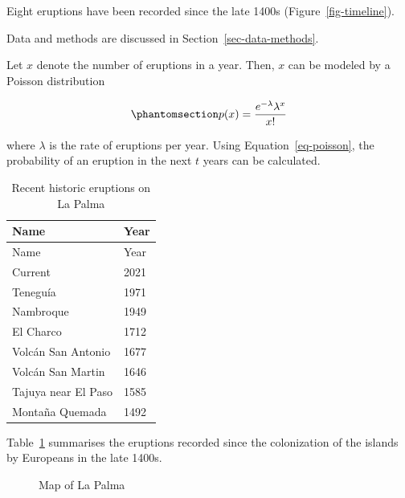 \documentclass[
]{agujournal2019}
\begin{document}
Eight eruptions have been recorded since the late 1400s
(Figure~\ref{fig-timeline}).

Data and methods are discussed in Section~\ref{sec-data-methods}.

Let \(x\) denote the number of eruptions in a year. Then, \(x\) can be
modeled by a Poisson distribution

\begin{equation}\phantomsection\label{eq-poisson}{
p(x) = \frac{e^{-\lambda} \lambda^{x}}{x !}
}\end{equation}

where \(\lambda\) is the rate of eruptions per year. Using
Equation~\ref{eq-poisson}, the probability of an eruption in the next
\(t\) years can be calculated.

\begin{longtable}[]{@{}ll@{}}
\caption{Recent historic eruptions on La
Palma}\label{tbl-history}\tabularnewline
\toprule\noalign{}
Name & Year \\
\midrule\noalign{}
\endfirsthead
\toprule\noalign{}
Name & Year \\
\midrule\noalign{}
\endhead
\bottomrule\noalign{}
\endlastfoot
Current & 2021 \\
Teneguía & 1971 \\
Nambroque & 1949 \\
El Charco & 1712 \\
Volcán San Antonio & 1677 \\
Volcán San Martin & 1646 \\
Tajuya near El Paso & 1585 \\
Montaña Quemada & 1492 \\
\end{longtable}

Table~\ref{tbl-history} summarises the eruptions recorded since the
colonization of the islands by Europeans in the late 1400s.

\begin{figure}


\caption{\label{fig-map}Map of La Palma}

\end{figure}%
\end{document}
